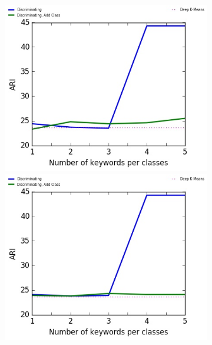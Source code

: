\begin{figure}[!h]
\begin{subfigure}[b]{\textwidth}
\begin{minipage}{0.5\linewidth}
\centering
  \includegraphics[scale=0.49]{parts/res/dat_file/ari/20NEWS_noisy.jpg}     
\end{minipage}
  \begin{minipage}{0.5\linewidth}
\centering
   \includegraphics[scale=0.49]{parts/res/dat_file/ari/20NEWS_noisy_simple.jpg}     
\end{minipage}
\end{subfigure}
\begin{subfigure}[b]{\textwidth}
\begin{minipage}{0.5\linewidth}
\centering

\end{minipage}
\end{subfigure}
\end{figure}
